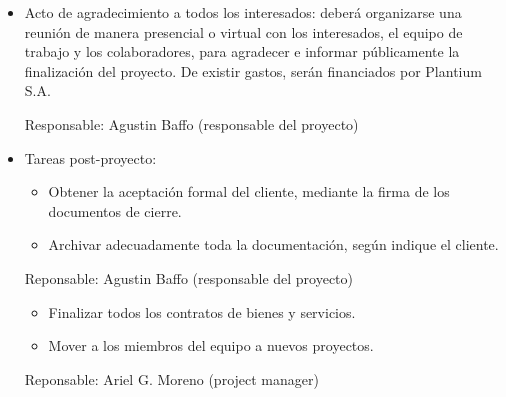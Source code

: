 \documentclass[
11pt, %
codirector, %
]{charter}
\begin{document}
\begin{itemize}
\item Acto de agradecimiento a todos los interesados: deberá organizarse una reunión de manera presencial o virtual con los interesados, el equipo de trabajo y los colaboradores, para agradecer e informar públicamente la finalización del proyecto. De existir gastos, serán financiados por Plantium S.A.

Responsable: Agustin Baffo (responsable del proyecto)

\item Tareas post-proyecto:
\begin{itemize}
\item Obtener la aceptación formal del cliente, mediante la firma de los documentos de cierre.
\item Archivar adecuadamente toda la documentación, según indique el cliente.
\end{itemize}

Reponsable: Agustin Baffo (responsable del proyecto)
\begin{itemize}
\item Finalizar todos los contratos de bienes y servicios.
\item Mover a los miembros del equipo a nuevos proyectos.

\end{itemize}
Reponsable: Ariel G. Moreno (project manager)

\end{itemize}
\end{document}
